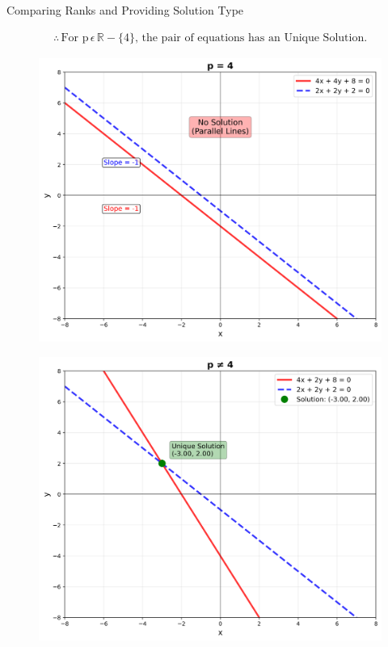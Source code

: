 \documentclass[journal]{IEEEtran}
\begin{document}
\bigskip

Comparing Ranks and Providing Solution Type
\begin{center}

\end{center}

\begin{align}
\boxed{\therefore \, \text{For p} \, \epsilon \, \mathbb{R}-\{4\}, \, \text{the pair of equations has an Unique Solution.}}
\end{align}


\begin{figure}[htbp]
\centering
\includegraphics[width=0.7\columnwidth]{figs/fig1.png}
\label{fig:figs/fig1.png}
\end{figure}

\begin{figure}[htbp]
\centering
\includegraphics[width=0.7\columnwidth]{figs/fig2.png}
\label{fig:figs/fig2.png}
\end{figure}
\end{document}
